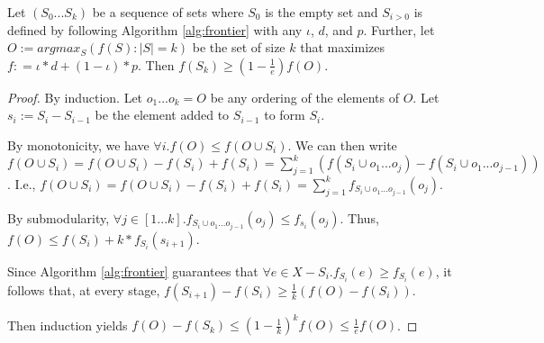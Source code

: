 \begin{theorem}\label{thm:greedy-approximation}
    Let $(S_0...S_k)$ be a sequence of sets where $S_0$ is the empty set and $S_{i>0}$ is defined by following Algorithm \ref{alg:frontier} with any $\iota$, $d$, and $p$. Further, let $O := argmax_S(f(S) : |S| = k)$ be the set of size $k$ that maximizes $f: = \iota*d+(1-\iota)*p$. Then $f(S_k) \geq (1 - \frac{1}{e})f(O)$.
\end{theorem}

\begin{proof}
By induction. Let ${o_1...o_k} = O$ be any ordering of the elements of $O$. Let ${s_i} := S_i - S_{i-1}$ be the element added to $S_{i-1}$ to form $S_i$.

By monotonicity, we have $\forall i . f(O) \leq f(O \cup S_i)$.  We can then write $f(O \cup S_i) = f(O \cup S_i) - f(S_i) + f(S_i) = \sum_{j=1}^{k} (f(S_i \cup {o_1...o_j}) - f(S_i \cup {o_1...o_{j-1}}))$. I.e., $f(O \cup S_i) = f(O \cup S_i) - f(S_i) + f(S_i) = \sum_{j=1}^{k} f_{S_i \cup {o_1...o_{j-1}}}(o_j)$.

By submodularity, $\forall j \in [1...k] . f_{S_i \cup {o_1...o_{j-1}}}(o_j) \leq f_{s_i}(o_j)$. Thus, $f(O) \leq f(S_i) + k*f_{S_i}(s_{i+1})$. 

Since Algorithm \ref{alg:frontier} guarantees that $\forall e \in X - S_i . f_{S_i}(e) \geq f_{S_i}(e)$, it follows that, at every stage, $f(S_{i+1}) - f(S_i) \geq \frac{1}{k} (f(O) - f(S_i))$.

Then induction yields $f(O) - f(S_k) \leq (1 - \frac{1}{k})^k f(O) \leq \frac{1}{e} f(O)$.
\end{proof}
